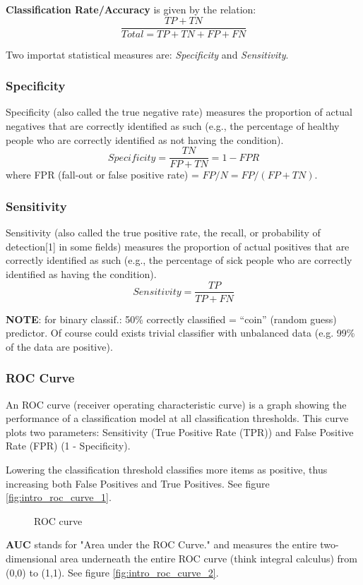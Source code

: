 \documentclass[../main.tex]{subfiles}
\begin{document}
\noindent\textbf{Classification Rate/Accuracy} is given by the relation:
$$ \frac{TP + TN}{Total = TP + TN + FP + FN}$$ 

Two importat statistical measures are: \textit{Specificity} and \textit{Sensitivity}.

\subsubsection*{Specificity}%
Specificity (also called the true negative rate) measures the proportion of actual negatives that are correctly identified as such (e.g., the percentage of healthy people who are correctly identified as not having the condition).
$$ Specificity = \frac{TN}{FP + TN} = 1 - FPR $$
where FPR (fall-out or false positive rate) = $FP/N = FP/(FP + TN)$.

\subsubsection*{Sensitivity}
Sensitivity (also called the true positive rate, the recall, or probability of detection[1] in some fields) measures the proportion of actual positives that are correctly identified as such (e.g., the percentage of sick people who are correctly identified as having the condition).
$$ Sensitivity = \frac{TP}{TP + FN}$$

\textbf{NOTE}: for binary classif.: 50\% correctly classified = “coin” (random guess) predictor. Of course could exists trivial classifier with unbalanced data (e.g. 99\% of the data are positive).

\subsubsection*{ROC Curve}
An ROC curve (receiver operating characteristic curve) is a graph showing the performance of a classification model at all classification thresholds. This curve plots two parameters: Sensitivity (True Positive Rate (TPR)) and False Positive Rate (FPR) (1 - Specificity).

Lowering the classification threshold classifies more items as positive, thus increasing both False Positives and True Positives. See figure \ref{fig:intro_roc_curve_1}.

\begin{figure}[ht]
  \centering
  \hfill
  \caption{ROC curve}
\end{figure}
\textbf{AUC} stands for "Area under the ROC Curve." and measures the entire two-dimensional area underneath the entire ROC curve (think integral calculus) from (0,0) to (1,1). See figure \ref{fig:intro_roc_curve_2}.
\end{document}
